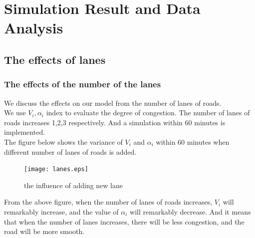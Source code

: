 \documentclass[UTF8]{mcmthesis}
\begin{document}
\section{Simulation Result and Data Analysis}
\subsection{The effects of lanes}
\subsubsection{The effects of the number of the lanes}
\label{lanes}
We discuss the effects on our model from the number of lanes of roads.\\
\indent We use $V_{i}, \alpha_{i}$ index to evaluate the degree of congestion. The number of lanes of roads increases 1,2,3 respectively. And a simulation within 60 minutes is implemented.\\
\indent The figure below shows the variance of $V_{i}$ and $\alpha_{i}$ within 60 minutes when different number of lanes of roads is added.\\
\begin{figure}[H]
	\centerline{\texttt{[image: lanes.eps]}}
	\caption{the influence of adding new lane}	
\end{figure}
\indent From the above figure, when the number of lanes of roads increases, $V_{i}$ will remarkably increase, and the value of $\alpha_{i}$ will remarkably decrease. And it means that when the number of lanes increases, there will be less congestion, and the road will be more smooth. 
\end{document}
